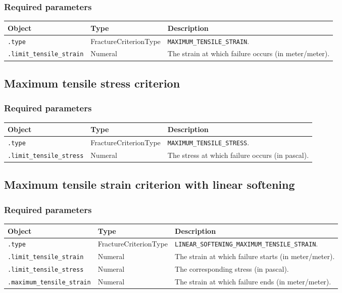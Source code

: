 \documentclass[10pt]{article}
\begin{document}
\subsubsection*{Required parameters}

\begin{tabularx}{\textwidth}{llX}
\hline 
Object & Type & Description \\ 
\hline 
\verb+.type+ & FractureCriterionType & \verb+MAXIMUM_TENSILE_STRAIN+. \\ 
\verb+.limit_tensile_strain+ & Numeral & The strain at which failure occurs (in meter/meter).\\
\hline 
\end{tabularx}

\subsection{Maximum tensile stress criterion}

\subsubsection*{Required parameters}

\begin{tabularx}{\textwidth}{llX}
\hline 
Object & Type & Description \\ 
\hline 
\verb+.type+ & FractureCriterionType & \verb+MAXIMUM_TENSILE_STRESS+. \\ 
\verb+.limit_tensile_stress+ & Numeral & The stress at which failure occurs (in pascal).\\
\hline 
\end{tabularx}

\subsection{Maximum tensile strain criterion with linear softening}

\subsubsection*{Required parameters}

\begin{tabularx}{\textwidth}{llX}
\hline 
Object & Type & Description \\ 
\hline 
\verb+.type+ & FractureCriterionType & \verb+LINEAR_SOFTENING_MAXIMUM_TENSILE_STRAIN+. \\ 
\verb+.limit_tensile_strain+ & Numeral & The strain at which failure starts (in meter/meter).\\
\verb+.limit_tensile_stress+ & Numeral & The corresponding stress (in pascal).\\
\verb+.maximum_tensile_strain+ & Numeral & The strain at which failure ends (in meter/meter).\\
\hline 
\end{tabularx}
\end{document}
